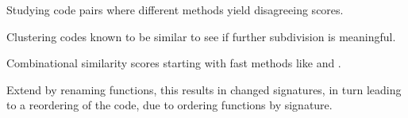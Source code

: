 \documentclass[../main.tex]{subfiles}
\begin{document}
Studying code pairs where different methods yield disagreeing scores.

Clustering codes known to be similar to see if further subdivision is meaningful.

Combinational similarity scores starting with fast methods like  and .

Extend \n{\solcts} by renaming functions, this results in changed  signatures, in turn leading to a reordering of the code, due to  ordering functions by signature.
\end{document}
